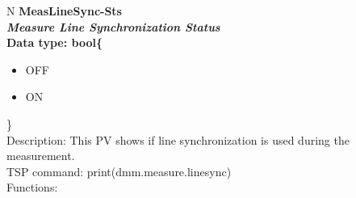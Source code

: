 \documentclass[openany]{article}
\begin{document}
		\begin{tabular}{N}
			\hline
			\bfseries MeasLineSync-Sts\label{pv:measlinesync-sts} \\ \hline
			\emph{Measure Line Synchronization Status} \\
			Data type: bool\{\begin{itemize}[noitemsep]
				\small
				\item[] OFF
				\item[] ON
			\end{itemize}\} \\
			Description: This PV shows if line synchronization is used during the measurement. \\
			TSP command: print(dmm.measure.linesync) \\
			Functions: \\
			\arrayrulecolor{\FuncTableBorderColor}

		\end{tabular}
\end{document}
